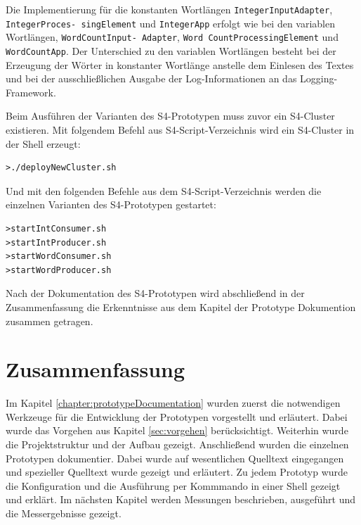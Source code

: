 

Die Implementierung für die konstanten Wortlängen \texttt{IntegerInputAdapter}, \texttt{IntegerProces- singElement} und \texttt{IntegerApp} erfolgt wie bei den variablen Wortlängen, \texttt{WordCountInput- Adapter}, \texttt{Word CountProcessingElement} und \texttt{WordCountApp}. Der Unterschied zu den variablen Wortlängen besteht bei der Erzeugung der Wörter in konstanter Wortlänge anstelle dem Einlesen des Textes und bei der ausschließlichen Ausgabe der Log-Informationen an das Logging-Framework.

Beim Ausführen der Varianten des S4-Prototypen muss zuvor ein S4-Cluster existieren. Mit folgendem Befehl aus S4-Script-Verzeichnis wird ein S4-Cluster in der Shell erzeugt:

\begin{verbatim}
>./deployNewCluster.sh
\end{verbatim}

Und mit den folgenden Befehle aus dem S4-Script-Verzeichnis werden die einzelnen Varianten des S4-Prototypen gestartet:

\begin{verbatim}
>startIntConsumer.sh
>startIntProducer.sh
>startWordConsumer.sh
>startWordProducer.sh
\end{verbatim}

Nach der Dokumentation des S4-Prototypen wird abschließend in der Zusammenfassung die Erkenntnisse aus dem Kapitel der Prototype Dokumention zusammen getragen.


\section{Zusammenfassung}

Im Kapitel \ref{chapter:prototypeDocumentation} wurden zuerst die notwendigen Werkzeuge für die Entwicklung der Prototypen vorgestellt und erläutert. Dabei wurde das Vorgehen aus Kapitel \ref{sec:vorgehen} berücksichtigt. Weiterhin wurde die Projektstruktur und der Aufbau gezeigt. Anschließend wurden die einzelnen Prototypen dokumentier. Dabei wurde auf wesentlichen Quelltext eingegangen und spezieller Quelltext wurde gezeigt und erläutert. Zu jedem Prototyp wurde die Konfiguration und die Ausführung per Kommmando in einer Shell gezeigt und erklärt. Im nächsten Kapitel werden Messungen beschrieben, ausgeführt und die Messergebnisse gezeigt.